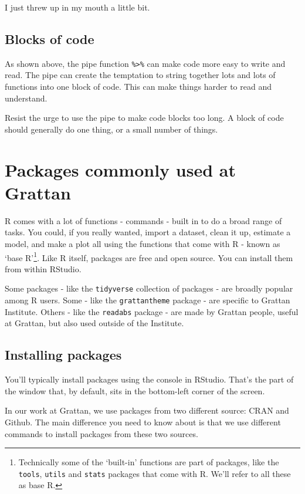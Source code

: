 \documentclass[]{book}
\let\rmarkdownfootnote\footnote%
\def\footnote{\protect\rmarkdownfootnote}
\begin{document}
I just threw up in my mouth a little bit.

\hypertarget{blocks-of-code}{%
\section{Blocks of code}\label{blocks-of-code}}

As shown above, the pipe function \texttt{\%\textgreater{}\%} can make code more easy to write and read. The pipe can create the temptation to string together lots and lots of functions into one block of code. This can make things harder to read and understand.

Resist the urge to use the pipe to make code blocks too long. A block of code should generally do one thing, or a small number of things.

\hypertarget{packages}{%
\chapter{Packages commonly used at Grattan}\label{packages}}

R comes with a lot of functions - commands - built in to do a broad range of tasks. You could, if you really wanted, import a dataset, clean it up, estimate a model, and make a plot all using the functions that come with R - known as `base R'\footnote{Technically some of the `built-in' functions are part of packages, like the \texttt{tools}, \texttt{utils} and \texttt{stats} packages that come with R. We'll refer to all these as base R.}. Like R itself, packages are free and open source. You can install them from within RStudio.

Some packages - like the \texttt{tidyverse} collection of packages - are broadly popular among R users. Some - like the \texttt{grattantheme} package - are specific to Grattan Institute. Others - like the \texttt{readabs} package - are made by Grattan people, useful at Grattan, but also used outside of the Institute.

\hypertarget{install-packages}{%
\section{Installing packages}\label{install-packages}}

You'll typically install packages using the console in RStudio. That's the part of the window that, by default, sits in the bottom-left corner of the screen.

In our work at Grattan, we use packages from two different source: CRAN and Github. The main difference you need to know about is that we use different commands to install packages from these two sources.
\end{document}
